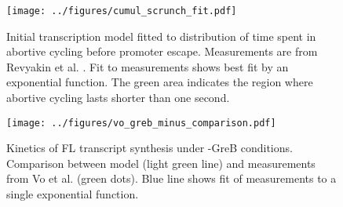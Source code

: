 \begin{figure}
    \begin{center}
      \texttt{[image: ../figures/cumul\_scrunch\_fit.pdf]}
    \end{center}
    \caption{Initial transcription model fitted to distribution of time spent
      in abortive cycling before promoter escape. Measurements are
      from Revyakin et al. \cite{revyakin_abortive_2006}. Fit to measurements
      shows best fit by an exponential function. The green area indicates the
      region where abortive cycling lasts shorter than one second.}
\label{fig:revyakin_fit}
\end{figure}


\begin{figure}
    \begin{center}
        \texttt{[image: ../figures/vo\_greb\_minus\_comparison.pdf]}
    \end{center}
    \caption{Kinetics of FL transcript synthesis under -GreB conditions.
      Comparison between model (light green line) and measurements from Vo
      et al. \cite{vo_vitro_2003-1} (green dots). Blue line shows fit of
      measurements to a single exponential function.}
\label{fig:vo_comparison}
\end{figure}


